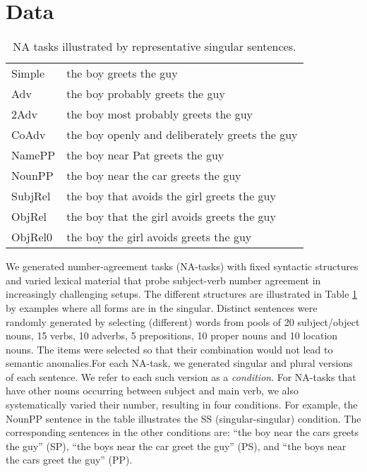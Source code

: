 \section{Data}

\begin{table}[tb]
  \centering
  \begin{footnotesize}
  \begin{tabular}{l@{\hskip1pt}l}
    \B Simple & the boy greets the guy\\
    \B Adv & the boy probably greets the guy\\
    \B 2Adv & the boy most probably greets the guy\\
    \B CoAdv &  the boy openly and deliberately greets the guy\\
    \B NamePP & the boy near Pat greets the guy\\
    \B NounPP & the boy near the car greets the guy\\
    \B SubjRel & the boy that avoids the girl greets the guy\\
    \B ObjRel  & the boy that the girl avoids greets the guy \\
    \B ObjRel0 &  the boy the girl avoids greets the guy\\
  \end{tabular}
  \end{footnotesize}
  \caption{NA tasks illustrated by representative
    singular sentences.}
  \label{tab:data-sets}
\end{table}

We generated number-agreement tasks (NA-tasks) with fixed syntactic
structures and varied lexical material that probe subject-verb number
agreement in increasingly challenging setups. The different structures
are illustrated in Table \ref{tab:data-sets} by examples where all
forms are in the singular. Distinct sentences were randomly generated
by selecting (different) words from pools of 20 subject/object nouns,
15 verbs, 10 adverbs, 5 prepositions, 10 proper nouns and 10 location
nouns. The items were selected so that their combination would not
lead to semantic anomalies.For each NA-task, we generated singular and
plural versions of each sentence. We refer to each such version as a
\textit{condition}. For NA-tasks that have other nouns occurring between
subject and main verb, we also systematically varied their number,
resulting in four conditions. For example, the NounPP sentence in the
table illustrates the SS (singular-singular) condition. The
corresponding sentences in the other conditions are: ``the boy near
the cars greets the guy'' (SP), ``the boys near the car greet the
guy'' (PS), and ``the boys near the cars greet the guy'' (PP).


